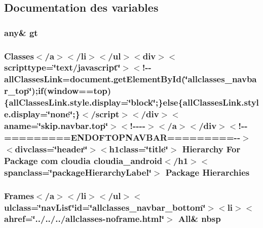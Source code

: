 \subsection{Documentation des variables}
\hypertarget{com_2cloudia_2cloudia__android_2package-tree_8html_a1bb4447113f0bd7bf49e2b3dee2e065d}{
\subsubsection[{gt}]{\setlength{\rightskip}{0pt plus 5cm}any\& gt}}\label{com_2cloudia_2cloudia__android_2package-tree_8html_a1bb4447113f0bd7bf49e2b3dee2e065d}
\hypertarget{com_2cloudia_2cloudia__android_2package-tree_8html_a67dd30bdaba69f030847a823956cbd39}{
\subsubsection[{Hierarchies}]{\setlength{\rightskip}{0pt plus 5cm}Classes$<$/{\bf a}$>$$<$/li$>$$<$/ul$>$$<$div$>$$<$scripttype=\char`\"{}text/javascript\char`\"{}$>$$<$!-\/-\/all\-Classes\-Link=document.\-get\-Element\-By\-Id(\char`\"{}allclasses\-\_\-navbar\-\_\-top\char`\"{});if(window==top)\{all\-Classes\-Link.\-style.\-display=\char`\"{}block\char`\"{};\}else\{all\-Classes\-Link.\-style.\-display=\char`\"{}none\char`\"{};\}$<$/script$>$$<$/div$>$$<$aname=\char`\"{}skip.\-navbar.\-top\char`\"{}$>$$<$!-\/-\/-\/-\/$>$$<$/a$>$$<$/div$>$$<$!-\/-\/=========E\-N\-D\-O\-F\-T\-O\-P\-N\-A\-V\-B\-A\-R=========-\/-\/$>$$<$divclass=\char`\"{}header\char`\"{}$>$$<$h1class=\char`\"{}title\char`\"{}$>$ Hierarchy For Package com cloudia cloudia\-\_\-android$<$/h1$>$$<$spanclass=\char`\"{}package\-Hierarchy\-Label\char`\"{}$>$ Package Hierarchies}}\label{com_2cloudia_2cloudia__android_2package-tree_8html_a67dd30bdaba69f030847a823956cbd39}
\hypertarget{com_2cloudia_2cloudia__android_2package-tree_8html_aff329d23a24e17d925e4078265e1c7cf}{
\subsubsection[{nbsp}]{\setlength{\rightskip}{0pt plus 5cm}Frames$<$/{\bf a}$>$$<$/li$>$$<$/ul$>$$<$ulclass=\char`\"{}nav\-List\char`\"{}id=\char`\"{}allclasses\-\_\-navbar\-\_\-bottom\char`\"{}$>$$<$li$>$$<$ahref=\char`\"{}../../../allclasses-\/noframe.\-html\char`\"{}$>$ All\& nbsp}}\label{com_2cloudia_2cloudia__android_2package-tree_8html_aff329d23a24e17d925e4078265e1c7cf}
